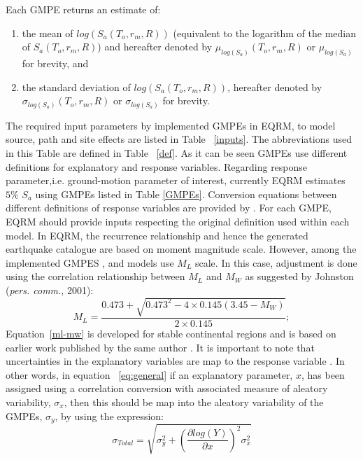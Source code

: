 Each GMPE returns an estimate of:
\begin{enumerate}
\item the mean of $log(S_a(T_o,r_m,R))$ (equivalent to the
logarithm of the median of $S_a(T_o,r_m,R)$) and hereafter denoted
by $\mu_{log(S_a)}(T_o,r_m,R)$ or $\mu_{log(S_a)}$ for brevity, and
\item the standard deviation of $log(S_a(T_o,r_m,R))$, hereafter
denoted by \newline $\sigma_{log(S_a)}(T_o,r_m,R)$ or
$\sigma_{log(S_a)}$ for brevity.
\end{enumerate}


The required input parameters by implemented GMPEs in EQRM, to model
source, path and site effects are listed in Table ~\ref{inputs}. The
abbreviations used in this Table are defined in Table ~\ref{def}. As
it can be seen GMPEs use different definitions for explanatory and
response variables. Regarding response parameter,i.e. ground-motion
parameter of interest, currently EQRM estimates $5 \%$ $S_a$ using
GMPEs listed in Table \ref{GMPEs}. Conversion equations between
different definitions of response variables are provided by
\citet{eqrm_Beyer06}.  For each GMPE, EQRM should provide inputs
respecting the original definition used within each model. In EQRM,
the recurrence relationship and hence the generated earthquake
catalogue are based on moment magnitude scale. However, among the
implemented GMPES \citet{eqrm_Gaull90a}, and \citet{eqrm_Liang08}
models use $M_L$ scale. In this case, adjustment is done using the
correlation relationship between $M_L$ and $M_W$ as suggested by
Johnston (\textit{pers. comm.}, 2001):
\begin{equation}\label{ml-mw}
M_L =
\frac{0.473+\sqrt{0.473^2-4\times0.145(3.45-M_W)}}{2\times0.145};
\end{equation}
Equation~\ref{ml-mw} is developed for stable continental regions and
is based on earlier work published by the same author
\citep{eqrm_Johnstone96a}. It is important to note that
uncertainties in the explanatory variables are map to the response
variable \citep{eqrm_Bommer05}. In other words, in equation
~\ref{eq:general} if an explanatory parameter, $x$, has been
assigned using a correlation conversion with associated measure of
aleatory variability, $\sigma_x$, then this should be map into the
aleatory variability of the GMPEs, $\sigma_y$, by using the
expression:
\begin{equation}
\sigma_{Total} = \sqrt{\sigma_y^2+(\dfrac{\partial log(Y)}{\partial
x})^2 \sigma_x^2}
\end{equation}

